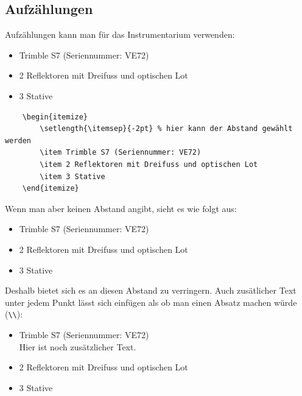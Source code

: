 \subsection{Aufzählungen}

Aufzählungen kann man für das Instrumentarium verwenden:

\begin{itemize}	
	\setlength{\itemsep}{-2pt} %
	\item Trimble S7 (Seriennummer: VE72)
	\item 2 Reflektoren mit Dreifuss und optischen Lot
	\item 3 Stative
\end{itemize}

\begin{verbatim}
    \begin{itemize}	
    	\setlength{\itemsep}{-2pt} % hier kann der Abstand gewählt werden
    	\item Trimble S7 (Seriennummer: VE72)
    	\item 2 Reflektoren mit Dreifuss und optischen Lot
    	\item 3 Stative
    \end{itemize}
\end{verbatim}

Wenn man aber keinen Abstand angibt, sieht es wie folgt aus:

\begin{itemize}	
	\item Trimble S7 (Seriennummer: VE72)
	\item 2 Reflektoren mit Dreifuss und optischen Lot
	\item 3 Stative
\end{itemize}

Deshalb bietet sich es an diesen Abstand zu verringern. Auch zusätlicher Text unter jedem Punkt lässt sich einfügen als ob man einen Absatz machen würde (\verb|\\|):

\begin{itemize}	
	\setlength{\itemsep}{-2pt} %
	\item Trimble S7 (Seriennummer: VE72)\\
	Hier ist noch zusätzlicher Text.
	\item 2 Reflektoren mit Dreifuss und optischen Lot
	\item 3 Stative
\end{itemize}

